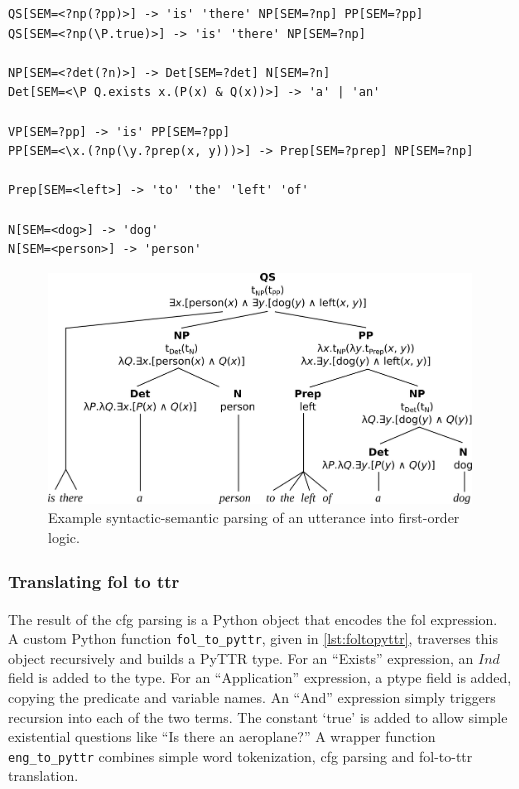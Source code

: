 \begin{lstlisting}[label={lst:grammar}, caption=A snippet of the FCFG grammar]
QS[SEM=<?np(?pp)>] -> 'is' 'there' NP[SEM=?np] PP[SEM=?pp]
QS[SEM=<?np(\P.true)>] -> 'is' 'there' NP[SEM=?np]

NP[SEM=<?det(?n)>] -> Det[SEM=?det] N[SEM=?n]
Det[SEM=<\P Q.exists x.(P(x) & Q(x))>] -> 'a' | 'an'

VP[SEM=?pp] -> 'is' PP[SEM=?pp]
PP[SEM=<\x.(?np(\y.?prep(x, y)))>] -> Prep[SEM=?prep] NP[SEM=?np]

Prep[SEM=<left>] -> 'to' 'the' 'left' 'of'

N[SEM=<dog>] -> 'dog'
N[SEM=<person>] -> 'person'
\end{lstlisting}

\begin{figure}[h]
\includegraphics[width=\textwidth]{tree}
\centering
\caption{Example syntactic-semantic parsing of an utterance into first-order logic.}
\label{fig:tree}
\end{figure}



\subsubsection{Translating \gls{fol} to \gls{ttr}}

The result of the \gls{cfg} parsing is a Python object that encodes the \gls{fol} expression.
A custom Python function \texttt{fol\_to\_pyttr}, given in \autoref{lst:foltopyttr}, traverses this object recursively and builds a PyTTR type.
For an ``Exists'' expression, an $Ind$ field is added to the type.
For an ``Application'' expression, a ptype field is added, copying the predicate and variable names.
An ``And'' expression simply triggers recursion into each of the two terms.
The constant `true' is added to allow simple existential questions like ``Is there an aeroplane?''
A wrapper function \texttt{eng\_to\_pyttr} combines simple word tokenization, \gls{cfg} parsing and \gls{fol}-to-\gls{ttr} translation.

